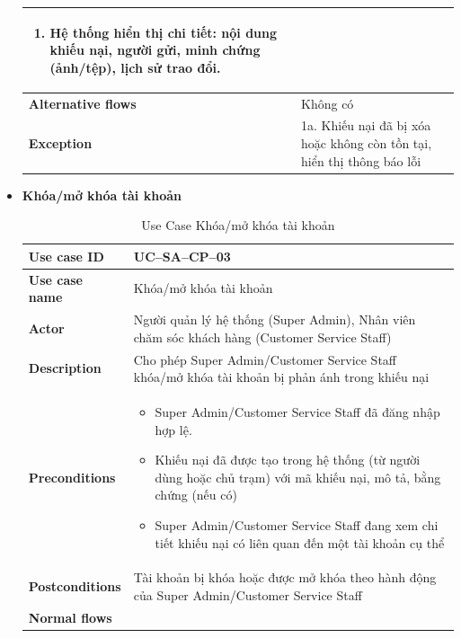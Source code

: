 \begin{itemize}
\begin{center}
\begin{longtable}{|m{}|m{}|}
\begin{enumerate}[label=\arabic*.]
        \item Hệ thống hiển thị chi tiết: nội dung khiếu nại, người gửi, minh chứng (ảnh/tệp), lịch sử trao đổi.
      \end{enumerate}\\
      \hline
      \textbf{Alternative flows} &
      Không có\\
      \hline
      \textbf{Exception} &
      1a. Khiếu nại đã bị xóa hoặc không còn tồn tại, hiển thị thông báo lỗi\\
      \hline
      \end{longtable}
  \end{center}
\item \textbf{Khóa/mở khóa tài khoản}
  \begin{center}
    \renewcommand{\arraystretch}{1.5}
    \begin{longtable}{|m{}|m{}|}
          \caption{Use Case Khóa/mở khóa tài khoản}
      \label{tab:uc_sa_cp_03} \\
      \hline
      \textbf{Use case ID} & UC--SA--CP--03 \\
      \hline
      \textbf{Use case name} & Khóa/mở khóa tài khoản \\
      \hline
      \textbf{Actor} & Người quản lý hệ thống (Super Admin), Nhân viên chăm sóc khách hàng (Customer Service Staff) \\
      \hline
      \textbf{Description} & Cho phép Super Admin/Customer Service Staff khóa/mở khóa tài khoản bị phản ánh trong khiếu nại\\
      \hline
      \textbf{Preconditions} &
      \begin{itemize}
        \item Super Admin/Customer Service Staff đã đăng nhập hợp lệ.
        \item Khiếu nại đã được tạo trong hệ thống (từ người dùng hoặc chủ trạm) với mã khiếu nại, mô tả, bằng chứng (nếu có)
        \item Super Admin/Customer Service Staff đang xem chi tiết khiếu nại có liên quan đến một tài khoản cụ thể
      \end{itemize}\\
      \hline
      \textbf{Postconditions} &
      Tài khoản bị khóa hoặc được mở khóa theo hành động của Super Admin/Customer Service Staff\\
      \hline
      \textbf{Normal flows} &
      \begin{enumerate}[label=\arabic*.]

\end{enumerate}
\end{longtable}
\end{center}
\end{itemize}
